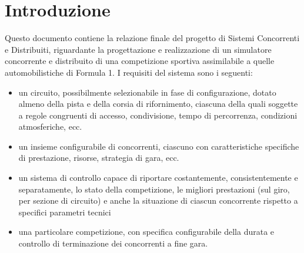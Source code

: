 \chapter{Introduzione} %

\label{Chapter1} %


Questo documento contiene la relazione finale del progetto di Sistemi Concorrenti e Distribuiti, riguardante la progettazione e realizzazione di un simulatore concorrente e distribuito di una competizione sportiva assimilabile a quelle automobilistiche di Formula 1.
I requisiti del sistema sono i seguenti:
\begin{itemize}
 \item un circuito, possibilmente selezionabile in fase di configurazione, dotato almeno della pista e della corsia di rifornimento, ciascuna della quali soggette a regole congruenti di accesso, condivisione, tempo di percorrenza, condizioni atmosferiche, ecc.
 \item un insieme configurabile di concorrenti, ciascuno con caratteristiche specifiche di prestazione, risorse, strategia di gara, ecc.
 \item un sistema di controllo capace di riportare costantemente, consistentemente e separatamente, lo stato della competizione, le migliori prestazioni (sul giro, per sezione di circuito) e anche la situazione di ciascun concorrente rispetto a specifici parametri tecnici
 \item una particolare competizione, con specifica configurabile della durata e controllo di terminazione dei concorrenti a fine gara.
\end{itemize}

